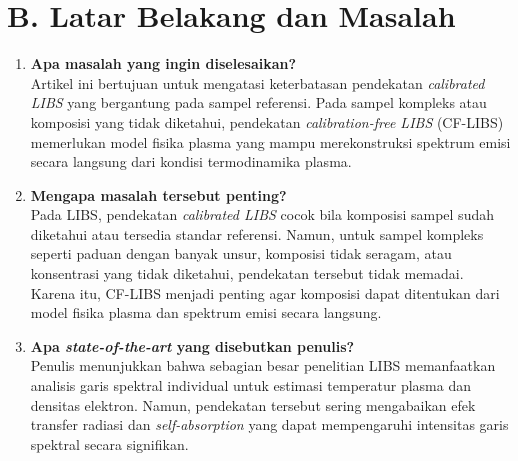 \documentclass[12pt,a4paper]{article}
\begin{document}
\section*{B. Latar Belakang dan Masalah}
\begin{enumerate}
  \item \textbf{Apa masalah yang ingin diselesaikan?}\\
  Artikel ini bertujuan untuk mengatasi keterbatasan pendekatan \textit{calibrated LIBS} yang bergantung pada sampel referensi. Pada sampel kompleks atau komposisi yang tidak diketahui, pendekatan \textit{calibration-free LIBS} (CF-LIBS) memerlukan model fisika plasma yang mampu merekonstruksi spektrum emisi secara langsung dari kondisi termodinamika plasma.

  \item \textbf{Mengapa masalah tersebut penting?}\\
  Pada LIBS, pendekatan \textit{calibrated LIBS} cocok bila komposisi sampel sudah diketahui atau tersedia standar referensi. Namun, untuk sampel kompleks seperti paduan dengan banyak unsur, komposisi tidak seragam, atau konsentrasi yang tidak diketahui, pendekatan tersebut tidak memadai. Karena itu, CF-LIBS menjadi penting agar komposisi dapat ditentukan dari model fisika plasma dan spektrum emisi secara langsung.

  \item \textbf{Apa \textit{state-of-the-art} yang disebutkan penulis?}\\
  Penulis menunjukkan bahwa sebagian besar penelitian LIBS memanfaatkan analisis garis spektral individual untuk estimasi temperatur plasma dan densitas elektron. Namun, pendekatan tersebut sering mengabaikan efek transfer radiasi dan \textit{self-absorption} yang dapat mempengaruhi intensitas garis spektral secara signifikan.
\end{enumerate}
\end{document}

